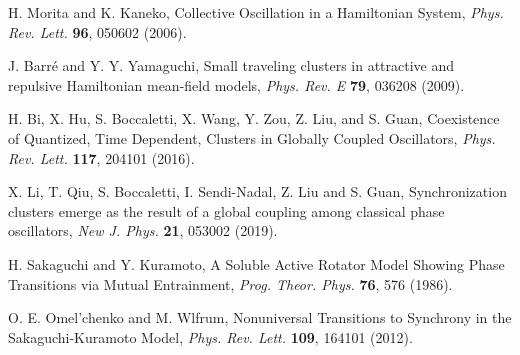 \begin{thebibliography}{99}
  H. Morita and K. Kaneko,
  Collective Oscillation in a Hamiltonian System,
  \textit{Phys. Rev. Lett.} \textbf{96}, 050602 (2006).
  

  
  





  
  J. Barr{\'e} and Y. Y. Yamaguchi,
  Small traveling clusters in attractive and repulsive Hamiltonian mean-field models,
  \textit{Phys. Rev. E} {\bf 79}, 036208 (2009).

H. Bi, X. Hu, S. Boccaletti, X. Wang,
Y. Zou, Z. Liu, and S. Guan,
Coexistence of Quantized, Time Dependent, Clusters in Globally Coupled Oscillators,
\textit{Phys. Rev. Lett.} \textbf{117}, 204101 (2016).

X. Li, T. Qiu, S. Boccaletti,
I. Sendi-Nadal, Z. Liu and S. Guan,
Synchronization clusters emerge as the result of a global coupling among classical phase oscillators,
\textit{New J. Phys.} \textbf{21}, 053002 (2019).

  H. Sakaguchi and Y. Kuramoto,
  A Soluble Active Rotator Model Showing Phase Transitions via Mutual Entrainment,
  \textit{Prog. Theor. Phys.} {\bf 76}, 576 (1986).

  O. E. Omel'chenko and M. Wlfrum,
  Nonuniversal Transitions to Synchrony in the Sakaguchi-Kuramoto Model,
  \textit{Phys. Rev. Lett.} {\bf 109}, 164101 (2012).


\end{thebibliography}
